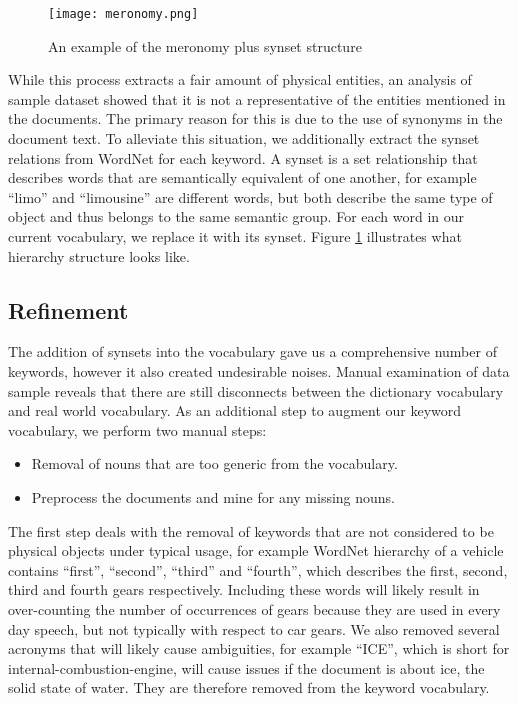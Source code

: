 	\begin{figure}
	   \centering  
	   \texttt{[image: meronomy.png]}
	   \caption{An example of the meronomy plus synset structure}
	   \label{figure:meronomy}
	\end{figure}

While this process extracts a fair amount of physical entities, an analysis of
sample dataset showed that it is not a representative of the entities mentioned
in the documents. The primary reason for this is due to the use of synonyms
in the document text. To alleviate this situation, we additionally extract
the synset relations from WordNet for each keyword. A synset is a set
relationship that describes words that are semantically equivalent of one
another, for example ``limo'' and ``limousine'' are different words, but both
describe the same type of object and thus belongs to the same semantic group.
For each word in our current vocabulary, we replace it with its synset. Figure
\ref{figure:meronomy} illustrates what hierarchy structure looks like.




\subsection{Refinement}
The addition of synsets into the vocabulary gave us a comprehensive number of
keywords, however it also created undesirable noises. Manual examination of data
sample reveals that there are still disconnects between the dictionary
vocabulary and real world vocabulary. As an additional step to augment our
keyword vocabulary, we perform two manual steps:

\begin{itemize} [noitemsep]
  \item Removal of nouns that are too generic from the vocabulary.
  \item Preprocess the documents and mine for any missing nouns.
\end{itemize}
The first step deals with the removal of keywords that are not considered to be
physical objects under typical usage, for example WordNet hierarchy of a
vehicle contains ``first'', ``second'', ``third'' and ``fourth'', which
describes the first, second, third and fourth gears respectively. Including
these words will likely result in over-counting the number of occurrences of
gears because they are used in every day speech, but not typically with respect
to car gears. We also removed several acronyms that will likely cause
ambiguities, for example ``ICE'', which is short for internal-combustion-engine,
will cause issues if the document is about ice, the solid state of water. They
are therefore removed from the keyword vocabulary.

